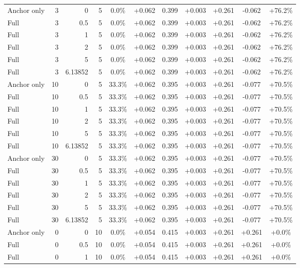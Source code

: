 \begin{table}[htbp]
\begin{tabular}{lrrrccccccc}
Anchor only & 3 & 0 & 5 & 0.0\% & +0.062 & 0.399 & +0.003 & +0.261 & -0.062 & +76.2\% \\
Full & 3 & 0.5 & 5 & 0.0\% & +0.062 & 0.399 & +0.003 & +0.261 & -0.062 & +76.2\% \\
Full & 3 & 1 & 5 & 0.0\% & +0.062 & 0.399 & +0.003 & +0.261 & -0.062 & +76.2\% \\
Full & 3 & 2 & 5 & 0.0\% & +0.062 & 0.399 & +0.003 & +0.261 & -0.062 & +76.2\% \\
Full & 3 & 5 & 5 & 0.0\% & +0.062 & 0.399 & +0.003 & +0.261 & -0.062 & +76.2\% \\
Full & 3 & 6.13852 & 5 & 0.0\% & +0.062 & 0.399 & +0.003 & +0.261 & -0.062 & +76.2\% \\
Anchor only & 10 & 0 & 5 & 33.3\% & +0.062 & 0.395 & +0.003 & +0.261 & -0.077 & +70.5\% \\
Full & 10 & 0.5 & 5 & 33.3\% & +0.062 & 0.395 & +0.003 & +0.261 & -0.077 & +70.5\% \\
Full & 10 & 1 & 5 & 33.3\% & +0.062 & 0.395 & +0.003 & +0.261 & -0.077 & +70.5\% \\
Full & 10 & 2 & 5 & 33.3\% & +0.062 & 0.395 & +0.003 & +0.261 & -0.077 & +70.5\% \\
Full & 10 & 5 & 5 & 33.3\% & +0.062 & 0.395 & +0.003 & +0.261 & -0.077 & +70.5\% \\
Full & 10 & 6.13852 & 5 & 33.3\% & +0.062 & 0.395 & +0.003 & +0.261 & -0.077 & +70.5\% \\
Anchor only & 30 & 0 & 5 & 33.3\% & +0.062 & 0.395 & +0.003 & +0.261 & -0.077 & +70.5\% \\
Full & 30 & 0.5 & 5 & 33.3\% & +0.062 & 0.395 & +0.003 & +0.261 & -0.077 & +70.5\% \\
Full & 30 & 1 & 5 & 33.3\% & +0.062 & 0.395 & +0.003 & +0.261 & -0.077 & +70.5\% \\
Full & 30 & 2 & 5 & 33.3\% & +0.062 & 0.395 & +0.003 & +0.261 & -0.077 & +70.5\% \\
Full & 30 & 5 & 5 & 33.3\% & +0.062 & 0.395 & +0.003 & +0.261 & -0.077 & +70.5\% \\
Full & 30 & 6.13852 & 5 & 33.3\% & +0.062 & 0.395 & +0.003 & +0.261 & -0.077 & +70.5\% \\
Anchor only & 0 & 0 & 10 & 0.0\% & +0.054 & 0.415 & +0.003 & +0.261 & +0.261 & +0.0\% \\
Full & 0 & 0.5 & 10 & 0.0\% & +0.054 & 0.415 & +0.003 & +0.261 & +0.261 & +0.0\% \\
Full & 0 & 1 & 10 & 0.0\% & +0.054 & 0.415 & +0.003 & +0.261 & +0.261 & +0.0\% \\

\end{tabular}
\end{table}
